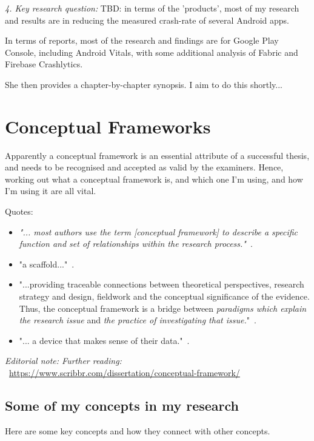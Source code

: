 \vspace{3mm}
\emph{4. Key research question: }
TBD: in terms of the 'products', most of my research and results are in reducing the measured crash-rate of several Android apps. 

In terms of reports, most of the research and findings are for Google Play Console, including Android Vitals, with some additional analysis of Fabric and Firebase Crashlytics.

\vspace{3mm}
She then provides a chapter-by-chapter synopsis. I aim to do this shortly...

\section{Conceptual Frameworks}
Apparently a conceptual framework is an essential attribute of a successful thesis, and needs to be recognised and accepted as valid by the examiners. Hence, working out what a conceptual framework is, and which one I'm using, and how I'm using it are all vital.

Quotes:
\begin{itemize}
    \item \emph{"... most authors use the term [conceptual framework] to describe a specific function and set of relationships within the research process."}~\cite{leshem2007overlooking}.
    \item "a scaffold..."~\cite{leshem2007overlooking}.
    \item "...providing traceable connections between theoretical perspectives, research strategy and design, fieldwork and the conceptual significance of the evidence. Thus, the conceptual framework is a bridge between \emph{paradigms which explain the research issue} and \emph{the practice of investigating that issue.}"~\cite{leshem2007overlooking}.
    \item "... a device that makes sense of their data."~\cite{leshem2007overlooking}.
\end{itemize}

\emph{Editorial note: Further reading: }~\url{https://www.scribbr.com/dissertation/conceptual-framework/}

\subsection{Some of my concepts in my research}
Here are some key concepts and how they connect with other concepts.


